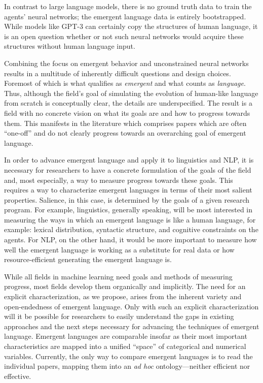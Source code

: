 In contrast to large language models,
    there is no ground truth data to train the agents' neural networks; the emergent language data is entirely bootstrapped.
While models like GPT-3 can certainly copy the structures of human language, it is an open question whether or not such neural networks would acquire these structures without human language input.

Combining the focus on emergent behavior and unconstrained neural networks results in a multitude of inherently difficult questions and design choices.
Foremost of which is what qualifies as \emph{emergent} and what counts as \emph{language}.
Thus, although the field's goal of simulating the evolution of human-like language from scratch is conceptually clear, the details are underspecified.
The result is a field with no concrete vision on what its goals are and how to progress towards them.
This manifests in the literature which comprises papers which are often ``one-off'' and do not clearly progress towards an overarching goal of emergent language.

In order to advance emergent language and apply it to linguistics and NLP, it is necessary for researchers to have a concrete formulation of the goals of the field and, most especially, a way to measure progress towards these goals.
This requires a way to characterize emergent languages in terms of their most salient properties.
Salience, in this case, is determined by the goals of a given research program.
For example, linguistics, generally speaking, will be most interested in measuring the ways in which an emergent language is like a human language, for example: lexical distribution, syntactic structure, and cognitive constraints on the agents.
For NLP, on the other hand, it would be more important to measure how well the emergent language is working as a substitute for real data or how resource-efficient generating the emergent language is.

While all fields in machine learning need goals and methods of measuring progress, most fields develop them organically and implicitly.
The need for an explicit characterization, as we propose, arises from the inherent variety and open-endedness of emergent language.
Only with such an explicit characterization will it be possible for researchers to easily understand the gaps in existing approaches and the next steps necessary for advancing the techniques of emergent language.
Emergent languages are comparable insofar as their most important characteristics are mapped into a unified ``space'' of categorical and numerical variables.
Currently, the only way to compare emergent languages is to read the individual papers, mapping them into an \emph{ad hoc} ontology---neither efficient nor effective.

